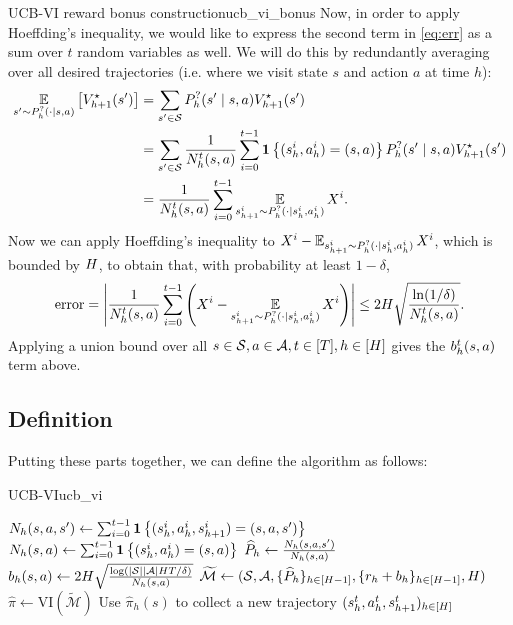 \documentclass[\main/main]{subfiles}
\begin{document}
\begin{derivation}{UCB-VI reward bonus construction}{ucb_vi_bonus}
    Now, in order to apply Hoeffding's inequality, we would like to express the second term in \eqref{eq:err} as a sum over $t$ random variables as well. We will do this by redundantly averaging over all desired trajectories (i.e. where we visit state $s$ and action $a$ at time $h$):
    \begin{align*}
        \operatorname*{\mathbb{E}}_{s' \sim P^?_h(\cdot \mid s, a)} \left[ V^\star_{h+1}(s') \right]
         & = \sum_{s' \in \mathcal{S}} P^?_h(s' \mid s, a) V^\star_{h+1}(s')                                                                              \\
         & = \sum_{s' \in \mathcal{S}} \frac{1}{N^t_h(s, a)} \sum_{i=0}^{t-1} \mathbf{1}\left\{ (s_h^i, a_h^i) = (s, a) \right\} P^?_h(s' \mid s, a) V^\star_{h+1}(s') \\
         & = \frac{1}{N^t_h(s, a)} \sum_{i=0}^{t-1} \operatorname*{\mathbb{E}}_{s_{h+1}^i \sim P^?_{h}(\cdot \mid s_h^i, a_h^i)} X^i.
    \end{align*}
    Now we can apply Hoeffding's inequality to $X^i - \operatorname*{\mathbb{E}}_{s_{h+1}^i \sim P^?_{h}(\cdot \mid s_h^i, a_h^i)} X^i$, which is bounded by $H$, to obtain that, with probability at least $1-\delta$,
    \[
        \text{error} = \left| \frac{1}{N^t_h(s, a)} \sum_{i=0}^{t-1} \left(X^i - \operatorname*{\mathbb{E}}_{s_{h+1}^i \sim P^?_{h}(\cdot \mid s_h^i, a_h^i)} X^i \right) \right| \le 2 H \sqrt{\frac{\ln(1/\delta)}{N_h^t(s, a)}}.
    \]
    Applying a union bound over all $s \in \mathcal{S}, a \in \mathcal{A}, t \in [T], h \in [H]$ gives the $b_h^t(s, a)$ term above.
\end{derivation}


\subsection{Definition}

Putting these parts together, we can define the algorithm as follows:

\begin{definition}{UCB-VI}{ucb_vi}
    \begin{algorithmic}
        \State
        $N_h(s, a, s') \gets \sum_{i=0}^{t-1} \mathbf{1}\left\{ (s_h^i, a_h^i, s_{h+1}^i) = (s, a, s') \right\}$
        \State $N_h(s, a) \gets \sum_{i=0}^{t-1} \mathbf{1}\left\{ (s_h^i, a_h^i) = (s, a) \right\}$
        \State $\widehat P_h \gets \frac{N_h(s, a, s')}{N_h(s, a)}$
        \State $b_h(s, a) \gets 2 H \sqrt{\frac{\log( |\mathcal{S}||\mathcal{A}|H T/\delta )}{N_h(s, a)}}$
        \State $\widetilde{\mathcal{M}} \gets (\mathcal{S}, \mathcal{A}, \{ \widehat{P}_h \}_{h \in [H-1]}, \{ r_h + b_h \}_{h \in [H-1]}, H)$
        \State $\hat \pi \gets \text{VI}(\tilde{\mathcal{M}})$
        \State Use $\hat \pi_h(s)$ to collect a new trajectory $(s^t_h, a^t_h, s^t_{h+1})_{h \in [H]}$
        \EndFor
    \end{algorithmic}
\end{definition}
\end{document}
